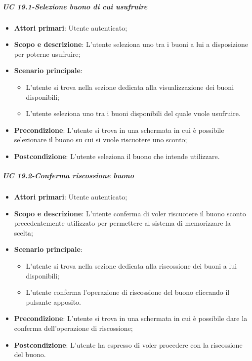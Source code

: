             
    \subparagraph{UC 19.1-Selezione buono di cui usufruire}
    \begin{itemize}
                \item \textbf{Attori primari}: Utente autenticato;
                
                 \item \textbf{Scopo e descrizione}: L’utente seleziona uno tra i buoni a lui a disposizione per poterne usufruire;
                 \item \textbf{Scenario principale}: 
                 \begin{itemize}
                     \item L’utente si trova nella sezione dedicata alla visualizzazione dei buoni disponibili;
                     \item L'utente seleziona uno tra i buoni disponibili del quale vuole usufruire.          \end{itemize}
                 \item \textbf{Precondizione}: L’utente si trova in una schermata in cui è possibile selezionare il buono su cui si vuole riscuotere uno sconto;
                 \item \textbf{Postcondizione}: L’utente seleziona il buono che intende utilizzare.
                 \end{itemize}
    
    \subparagraph{UC 19.2-Conferma riscossione buono}
    \begin{itemize}
                \item \textbf{Attori primari}: Utente autenticato;
               
                 \item \textbf{Scopo e descrizione}: L’utente conferma di voler riscuotere il buono sconto precedentemente utilizzato per permettere al sistema di memorizzare la scelta;
                 \item \textbf{Scenario principale}: 
                 \begin{itemize}
                     \item L’utente si trova nella sezione dedicata alla riscossione dei buoni a lui disponibili;
                     \item L'utente conferma l'operazione di riscossione del buono cliccando il pulsante apposito. 
                 \end{itemize}
                 \item \textbf{Precondizione}: L’utente si trova in una schermata in cui è possibile dare la conferma dell'operazione di riscossione;
                 \item \textbf{Postcondizione}: L’utente ha espresso di voler procedere con la riscossione del buono.
                 \end{itemize}
                   
